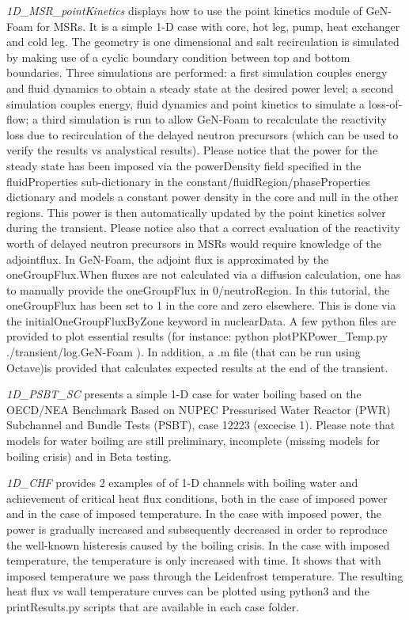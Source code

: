 \begin{DoxyItemize}
\item {\itshape 1\+D\+\_\+\+M\+S\+R\+\_\+point\+Kinetics} displays how to use the point kinetics module of Ge\+N-\/\+Foam for M\+S\+Rs. It is a simple 1-\/D case with core, hot leg, pump, heat exchanger and cold leg. The geometry is one dimensional and salt recirculation is simulated by making use of a cyclic boundary condition between top and bottom boundaries. Three simulations are performed\+: a first simulation couples energy and fluid dynamics to obtain a steady state at the desired power level; a second simulation couples energy, fluid dynamics and point kinetics to simulate a loss-\/of-\/flow; a third simulation is run to allow Ge\+N-\/\+Foam to recalculate the reactivity loss due to recirculation of the delayed neutron precursors (which can be used to verify the results vs analystical results). Please notice that the power for the steady state has been imposed via the power\+Density field specified in the fluid\+Properties sub-\/dictionary in the constant/fluid\+Region/phase\+Properties dictionary and models a constant power density in the core and null in the other regions. This power is then automatically updated by the point kinetics solver during the transient. Please notice also that a correct evaluation of the reactivity worth of delayed neutron precursors in M\+S\+Rs would require knowledge of the adjointflux. In Ge\+N-\/\+Foam, the adjoint flux is approximated by the one\+Group\+Flux.\+When fluxes are not calculated via a diffusion calculation, one has to manually provide the one\+Group\+Flux in 0/neutro\+Region. In this tutorial, the one\+Group\+Flux has been set to 1 in the core and zero elsewhere. This is done via the initial\+One\+Group\+Flux\+By\+Zone keyword in nuclear\+Data. A few python files are provided to plot essential results (for instance\+: python plot\+P\+K\+Power\+\_\+\+Temp.\+py ./transient/log.Ge\+N-\/\+Foam ). In addition, a .m file (that can be run using Octave)is provided that calculates expected results at the end of the transient.
\item {\itshape 1\+D\+\_\+\+P\+S\+B\+T\+\_\+\+SC} presents a simple 1-\/D case for water boiling based on the O\+E\+C\+D/\+N\+EA Benchmark Based on N\+U\+P\+EC Pressurised Water Reactor (P\+WR) Subchannel and Bundle Tests (P\+S\+BT), case 12223 (excecise 1). Please note that models for water boiling are still preliminary, incomplete (missing models for boiling crisis) and in Beta testing.
\item {\itshape 1\+D\+\_\+\+C\+HF} provides 2 examples of of 1-\/D channels with boiling water and achievement of critical heat flux conditions, both in the case of imposed power and in the case of imposed temperature. In the case with imposed power, the power is gradually increased and subsequently decreased in order to reproduce the well-\/known histeresis caused by the boiling crisis. In the case with imposed temperature, the temperature is only increased with time. It shows that with imposed temperature we pass through the Leidenfrost temperature. The resulting heat flux vs wall temperature curves can be plotted using python3 and the print\+Results.\+py scripts that are available in each case folder.

\end{DoxyItemize}
